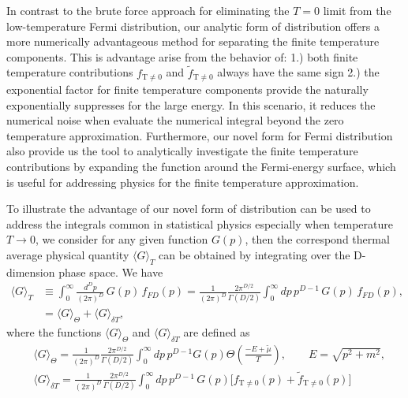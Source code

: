 \documentclass[sn-mathphys,Numbered]{sn-jnl}
\begin{document}
In contrast to the brute force approach for eliminating the $T=0$ limit from the low-temperature Fermi distribution, our analytic form of distribution offers a more numerically advantageous method for separating the finite temperature components. This is advantage arise from the behavior of: 1.) both finite temperature contributions $f_\mathrm{T\neq0}$ and $\tilde f_\mathrm{T\neq0}$ always have the same sign 2.) the exponential factor for finite temperature components provide the naturally exponentially suppresses for the large energy. In this scenario, it reduces the numerical noise when evaluate the numerical integral beyond the zero temperature approximation. Furthermore, our novel form for Fermi distribution also provide us the tool to analytically investigate the finite temperature contributions by expanding the function around the Fermi-energy surface, which is useful for addressing physics for the finite temperature approximation.

To illustrate the advantage of our novel form of distribution can be used to address the integrals common in statistical physics especially when temperature $T\to0$, we consider for any given function $G(p)$, then the correspond  thermal average physical quantity $\langle G\rangle_T$ can be obtained by integrating over the D-dimension phase space. We have
\begin{align}
\langle G\rangle_T&\equiv\int^{\infty}_{0}\!\!\frac{d^Dp}{(2\pi)^D}\,G(p)\,f_{FD}(p)=\frac{1}{(2\pi)^D}\frac{2\pi^{D/2}}{\Gamma(D/2)}\int^{\infty}_{0}\!\!dp\,p^{D-1}\,G(p)\,f_{FD}(p),\\
&=\langle G\rangle_{\Theta}+\langle G\rangle_{\delta T},
\end{align}
 where the functions $\langle G\rangle_{\Theta}$ and $\langle G\rangle_{\delta T}$ are defined as
\begin{align}
&\langle G\rangle_{\Theta}=\frac{1}{(2\pi)^D}\frac{2\pi^{D/2}}{\Gamma(D/2)}\int^{\infty}_{0}\!\!dp\,p^{D-1}G(p)\Theta\left(\frac{-E+\tilde\mu}{T}\right),\qquad E=\sqrt{p^2+m^2},\\
\label{G_deltaT}
&\langle G\rangle_{\delta T}=\frac{1}{(2\pi)^D}\frac{2\pi^{D/2}}{\Gamma(D/2)}\int^{\infty}_{0}\!\!dp\,p^{D-1}\,G(p)\bigg[f_\mathrm{T\neq0}(p)+\tilde f_\mathrm{T\neq0}(p)\bigg]
\end{align}
\end{document}
